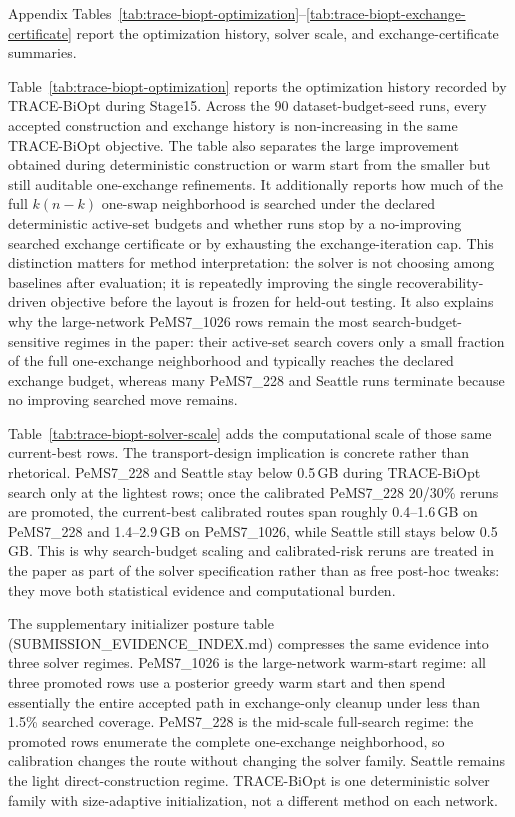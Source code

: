 
Appendix Tables~\ref{tab:trace-biopt-optimization}--\ref{tab:trace-biopt-exchange-certificate}
report the optimization history, solver scale, and exchange-certificate
summaries.

Table~\ref{tab:trace-biopt-optimization} reports the optimization history
recorded by TRACE-BiOpt during Stage15. Across the 90 dataset-budget-seed runs,
every accepted construction and exchange history is non-increasing in the same
TRACE-BiOpt objective. The table also separates the large improvement obtained
during deterministic construction or warm start from the smaller but still
auditable one-exchange refinements. It additionally reports how much of the
full $k(n-k)$ one-swap neighborhood is searched under the declared deterministic
active-set budgets and whether runs stop by a no-improving searched exchange
certificate or by exhausting the exchange-iteration cap. This distinction
matters for method interpretation: the solver is not choosing among baselines
after evaluation; it is repeatedly improving the single recoverability-driven
objective before the layout is frozen for held-out testing. It also explains
why the large-network PeMS7\_1026 rows remain the most search-budget-sensitive
regimes in the paper: their active-set search covers only a small fraction of
the full one-exchange neighborhood and typically reaches the declared exchange
budget, whereas many PeMS7\_228 and Seattle runs terminate because no improving
searched move remains.

Table~\ref{tab:trace-biopt-solver-scale} adds the computational scale of those
same current-best rows. The transport-design implication is concrete rather
than rhetorical. PeMS7\_228 and Seattle stay below 0.5\,GB during TRACE-BiOpt
search only at the lightest rows; once the calibrated PeMS7\_228 20/30\%
reruns are promoted, the current-best calibrated routes span roughly
0.4--1.6\,GB on PeMS7\_228 and 1.4--2.9\,GB on PeMS7\_1026, while Seattle still
stays below 0.5\,GB. This is why search-budget scaling and calibrated-risk
reruns are treated in the paper as part of the solver specification rather than
as free post-hoc tweaks: they move both statistical evidence and computational
burden.

The supplementary initializer posture table (SUBMISSION\_EVIDENCE\_INDEX.md)
compresses the same evidence into three solver regimes. PeMS7\_1026 is the
large-network warm-start regime: all three promoted rows use a posterior greedy
warm start and then spend essentially the entire accepted path in exchange-only
cleanup under less than 1.5\% searched coverage. PeMS7\_228 is the mid-scale
full-search regime: the promoted rows enumerate the complete one-exchange
neighborhood, so calibration changes the route without changing the solver
family. Seattle remains the light direct-construction regime. TRACE-BiOpt is
one deterministic solver family with size-adaptive initialization, not a
different method on each network.

